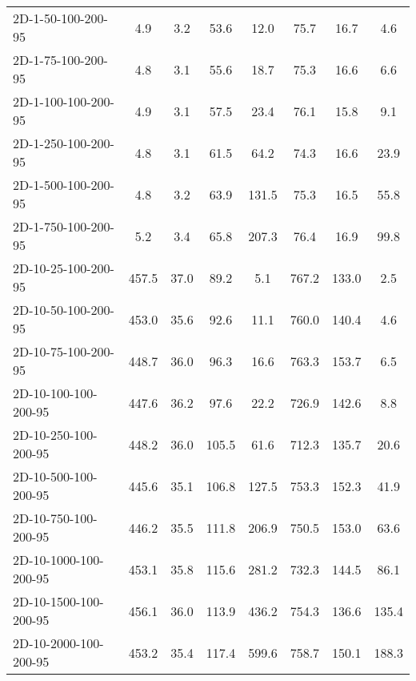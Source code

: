 \documentclass{article}
\begin{document}
\begin{table}[h]
\begin{center}
\begin{tabular}{|l||c|c|c|c|c|c|c|}
            2D-1-50-100-200-95            & 4.9     & 3.2       & 53.6       & 12.0        & 75.7     & 16.7      & 4.6        \\
            2D-1-75-100-200-95            & 4.8     & 3.1       & 55.6       & 18.7        & 75.3     & 16.6      & 6.6        \\
            2D-1-100-100-200-95           & 4.9     & 3.1       & 57.5       & 23.4        & 76.1     & 15.8      & 9.1        \\
            2D-1-250-100-200-95           & 4.8     & 3.1       & 61.5       & 64.2        & 74.3     & 16.6      & 23.9       \\
            2D-1-500-100-200-95           & 4.8     & 3.2       & 63.9       & 131.5       & 75.3     & 16.5      & 55.8       \\
            2D-1-750-100-200-95           & 5.2     & 3.4       & 65.8       & 207.3       & 76.4     & 16.9      & 99.8       \\
            \hline
            2D-10-25-100-200-95           & 457.5   & 37.0      & 89.2       & 5.1         & 767.2    & 133.0     & 2.5        \\
            2D-10-50-100-200-95           & 453.0   & 35.6      & 92.6       & 11.1        & 760.0    & 140.4     & 4.6        \\
            2D-10-75-100-200-95           & 448.7   & 36.0      & 96.3       & 16.6        & 763.3    & 153.7     & 6.5        \\
            2D-10-100-100-200-95          & 447.6   & 36.2      & 97.6       & 22.2        & 726.9    & 142.6     & 8.8        \\
            2D-10-250-100-200-95          & 448.2   & 36.0      & 105.5      & 61.6        & 712.3    & 135.7     & 20.6       \\
            2D-10-500-100-200-95          & 445.6   & 35.1      & 106.8      & 127.5       & 753.3    & 152.3     & 41.9       \\
            2D-10-750-100-200-95          & 446.2   & 35.5      & 111.8      & 206.9       & 750.5    & 153.0     & 63.6       \\
            2D-10-1000-100-200-95         & 453.1   & 35.8      & 115.6      & 281.2       & 732.3    & 144.5     & 86.1       \\
            2D-10-1500-100-200-95         & 456.1   & 36.0      & 113.9      & 436.2       & 754.3    & 136.6     & 135.4      \\
            2D-10-2000-100-200-95         & 453.2   & 35.4      & 117.4      & 599.6       & 758.7    & 150.1     & 188.3      \\

\end{tabular}
\end{center}
\end{table}
\end{document}

